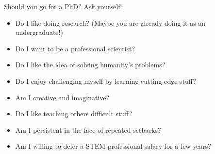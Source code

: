 \begin{frame}[fragile]{Should you go for a PhD?  Ask yourself:}

\begin{itemize}
    \item Do I like doing research? (Maybe you are already doing it as an undergraduate!)
    \item Do I want to be a professional scientist?
    \item Do I like the idea of solving humanity's problems?
    \item Do I enjoy challenging myself by learning cutting-edge stuff?
    \item Am I creative and imaginative?
    \item Do I like teaching others difficult stuff?
    \item Am I persistent in the face of repeated setbacks?
    \item Am I willing to defer a STEM professional salary for a few years?
\end{itemize}

\end{frame}

